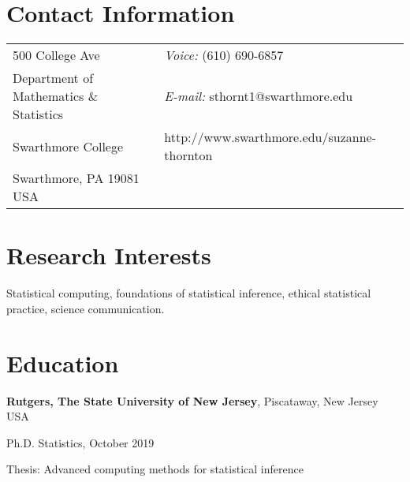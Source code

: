\documentclass[margin,line]{res}
\newenvironment{list1}{
  \begin{list}{\ding{113}}{%
      \setlength{\itemsep}{0in}
      \setlength{\parsep}{0in} \setlength{\parskip}{0in}
      \setlength{\topsep}{0in} \setlength{\partopsep}{0in} 
      \setlength{\leftmargin}{0.17in}}}{\end{list}}
\newenvironment{list2}{
  \begin{list}{$\bullet$}{%
      \setlength{\itemsep}{0in}
      \setlength{\parsep}{0in} \setlength{\parskip}{0in}
      \setlength{\topsep}{0in} \setlength{\partopsep}{0in} 
      \setlength{\leftmargin}{0.2in}}}{\end{list}}
\begin{document}

\begin{resume}
\section{\sc Contact Information}
\vspace{.05in}
\begin{tabular}{@{}p{3in}p{4in}}
500 College Ave    & {\it Voice:}  (610) 690-6857 \\            
Department of Mathematics \& Statistics  & {\it E-mail:}  sthornt1@swarthmore.edu\\  
Swarthmore College & http://www.swarthmore.edu/suzanne-thornton\\         
Swarthmore, PA  19081 USA  &     
\end{tabular}

\vspace*{-.1in}
\section{\sc Research Interests}
Statistical computing, foundations of statistical inference, ethical statistical practice, science communication. 

\section{\sc Education}
{\bf Rutgers, The State University of New Jersey}, Piscataway, New Jersey USA\\
\vspace*{-.1in}
\begin{list1}
\item[] Ph.D. Statistics, October 2019
\item[] Thesis: Advanced computing methods for statistical inference  
\vspace*{.05in}
\end{list1}


\end{resume}
\end{document}

